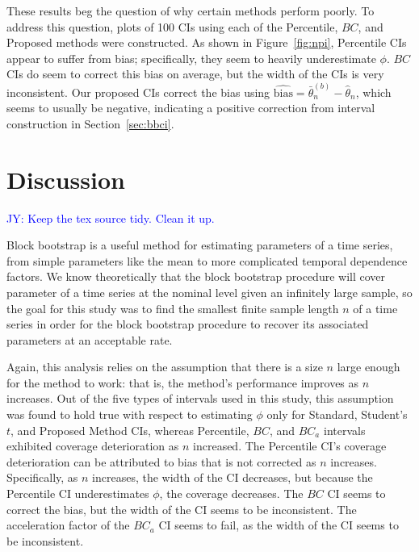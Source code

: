 \documentclass[12pt, letterpaper, titlepage]{article}
\newcommand{\jy}[1]{\textcolor{blue}{JY: #1}}
\begin{document}
These results beg the question of why certain methods perform poorly. To
address 
this question, plots of 100 CIs using each of the Percentile, $BC$, and Proposed 
methods were constructed. As shown in Figure~\ref{fig:npi}, Percentile CIs
appear to suffer from bias; specifically, they seem to heavily underestimate
$\phi$. $BC$ CIs do seem to correct this bias on average, but the width of the
CIs is very inconsistent. Our proposed CIs correct the bias using 
$\widehat{\text{bias}} = \bar\theta_n^{(b)} -  \hat\theta_n$,
which seems to usually be negative, indicating a positive 
correction from interval construction in Section~\ref{sec:bbci}.


\section{Discussion}
\label{sec:disc}


\jy{Keep the tex source tidy. Clean it up.}


Block bootstrap is a useful method for estimating parameters of a time
series, from simple parameters like the mean to more complicated temporal
 dependence factors.
 We know theoretically that the block bootstrap procedure will cover
  parameter of a time series at the nominal level given an
 infinitely large
sample, so the goal for this study was to find the smallest finite
sample length $n$ of a time series in order for the block bootstrap procedure
to 
recover its associated parameters at an acceptable rate.


Again, this analysis relies on the assumption that
there is a size $n$ large enough for the method to work: that is, the method's
performance improves as $n$ increases. Out of the five types of intervals used
in this study, this assumption was found to hold true with respect to
estimating $\phi$ only for Standard, Student's $t$, and Proposed Method CIs, 
whereas Percentile, 
$BC$, and $BC_a$ intervals exhibited coverage deterioration as $n$
increased. The Percentile CI's coverage deterioration can be attributed to
bias that is not corrected as $n$ increases. Specifically, as $n$ increases, 
the width of the CI decreases, but because the Percentile CI
underestimates $\phi$, the coverage decreases. The $BC$ CI seems to correct
the 
bias, but the width of the CI seems to be inconsistent. The acceleration 
factor of the $BC_a$ CI seems to fail, as the width of the CI
seems to be inconsistent. 
\end{document}
